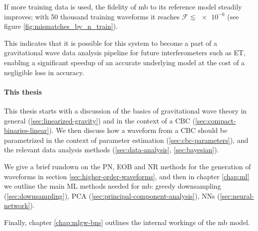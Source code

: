 \documentclass[main.tex]{subfiles}
\begin{document}
If more training data is used, the fidelity of \ac{mb} to its reference model steadily improves; with 50 thousand training waveforms it reaches \(\mathcal{F} \lesssim \num{e-6}\) (see figure \ref{fig:mismatches_by_n_train}). 

This indicates that it is possible for this system to become a part of a gravitational wave data analysis pipeline for future interferometers such as \ac{ET}, enabling a significant speedup of an accurate underlying model at the cost of a negligible loss in accuracy. 


\paragraph{This thesis}

This thesis starts with a discussion of the basics of gravitational wave theory in general (\ref{sec:linearized-gravity}) and in the context of a \ac{CBC} (\ref{sec:compact-binaries-linear}).
We then discuss how a waveform from a \ac{CBC} should be parametrized in the context of parameter estimation (\ref{sec:cbc-parameters}), and the relevant data analysis methods (\ref{sec:data-analysis}, \ref{sec:bayesian}). 

We give a brief rundown on the \ac{PN}, \ac{EOB} and \ac{NR} methods for the generation of waveforms in section \ref{sec:higher-order-waveforms}, and then in chapter \ref{chap:ml} we outline the main \ac{ML} methods needed for \ac{mb}: greedy downsampling (\ref{sec:downsampling}), \ac{PCA} (\ref{sec:principal-component-analysis}), \acp{NN} (\ref{sec:neural-network}). 

Finally, chapter \ref{chap:mlgw-bns} outlines the internal workings of the \ac{mb} model. 
\end{document}
